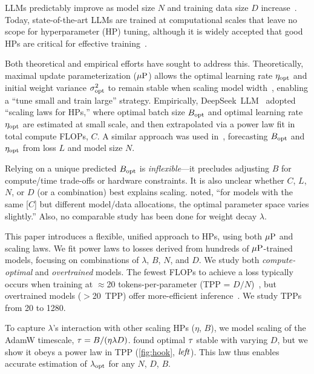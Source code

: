 LLMs predictably improve as model size $N$ and training data size $D$
increase~\citep{hestness2017scalinglaws,hoffmann2022empirical,kaplan2020scaling}.
%
Today, state-of-the-art LLMs are trained at computational scales that
leave no scope for hyperparameter (HP) tuning, although it is widely
accepted that good HPs are critical for effective
training~\citep{yang2022mup,wortsman2023small,bi2024deepseek}.

Both theoretical and empirical efforts have sought to address this.
Theoretically, maximal update parameterization ($\mbox{$\mu$P}$) allows the
optimal learning rate $\eta_{\text{opt}}$ and initial weight variance $\sigma^2_{\text{opt}}$
to remain stable when scaling model
width~\citep{yang2020feature,yang2022mup},
enabling a ``tune small and train large'' strategy.
%
Empirically, DeepSeek~LLM~\citep{bi2024deepseek} adopted ``scaling
laws for HPs,'' where optimal batch size $B_{\text{opt}}$ and optimal learning
rate $\eta_{\text{opt}}$ are estimated at small scale, and then extrapolated via
a power law fit in total compute FLOPs, $C$. A similar approach was
used in~\citet{kaplan2020scaling}, forecasting $B_{\text{opt}}$ and $\eta_{\text{opt}}$
from loss $L$ and model size $N$.

Relying on a unique predicted $B_{\text{opt}}$ is \emph{inflexible}---it
precludes adjusting $B$ for compute/time trade-offs or hardware
constraints.
%
It is also unclear whether $C$, $L$, $N$, or $D$ (or a combination)
best explains scaling.  \citet{bi2024deepseek} noted, ``for models with
the same [$C$] but different model/data allocations, the optimal
parameter space varies slightly.''
%
Also, no comparable study has been done for weight decay $\lambda$.

This paper introduces a flexible, unified approach to HPs, using both
$\mbox{$\mu$P}$ and scaling laws.
%
We fit power laws to losses derived from hundreds of $\mbox{$\mu$P}$-trained
models, focusing on combinations of $\lambda$, $B$, $N$, and $D$.
%
We study both \emph{compute-optimal} and \emph{overtrained} models.
The fewest FLOPs to achieve a loss typically occurs when training at
$\approx$20 tokens-per-parameter (TPP =
$D/N$)~\citep{hoffmann2022empirical,besiroglu2024chinchilla}, but
overtrained models ($>$20~TPP) offer more-efficient
inference~\citep{touvron2023llama}.  We study TPPs from 20 to 1280.

To capture $\lambda$'s interaction with other scaling HPs ($\eta$,
$B$), we model scaling of the AdamW timescale, $\tau =
B/(\eta\lambda D)$.
%
\citet{wang2024how} found optimal $\tau$ stable with
varying $D$, but we show it obeys a power law in TPP (\cref{fig:hook},
$\text{\emph{left}}$).
%
This law thus enables accurate estimation of $\lambda_{\text{opt}}$ for any $N$,
$D$, $B$.

